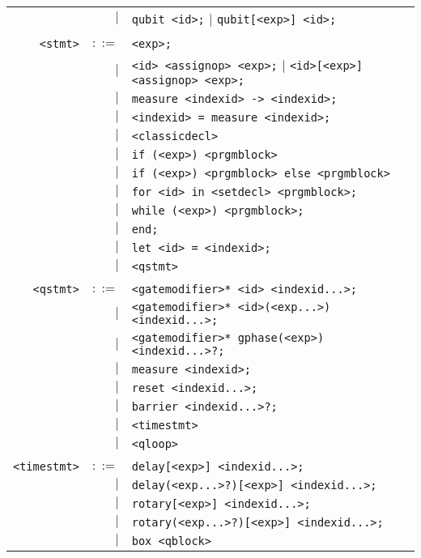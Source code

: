 \documentclass[notitlepage]{article}
\begin{document}
\begin{longtable}{rrl}
	    & $\mid$ & \texttt{qubit <id>;} $\mid$ \texttt{qubit[<exp>] <id>;} \\ \\
	\texttt{<stmt>} & $::=$ & \texttt{<exp>;} \\
	    & $\mid$ & \texttt{<id> <assignop> <exp>;} $\mid$ \texttt{<id>[<exp>] <assignop> <exp>;} \\
	    & $\mid$ & \texttt{measure <indexid> -> <indexid>;} \\
	    & $\mid$ & \texttt{<indexid> = measure <indexid>;} \\
	    & $\mid$ & \texttt{<classicdecl>} \\
	    & $\mid$ & \texttt{if (<exp>) <prgmblock>} \\
	    & $\mid$ & \texttt{if (<exp>) <prgmblock> else <prgmblock>} \\
	    & $\mid$ & \texttt{for <id> in <setdecl> <prgmblock>;} \\
	    & $\mid$ & \texttt{while (<exp>) <prgmblock>;} \\
	    & $\mid$ & \texttt{end;} \\
	    & $\mid$ & \texttt{let <id> = <indexid>;} \\
	    & $\mid$ & \texttt{<qstmt>} \\ \\
	\texttt{<qstmt>} & $::=$ & \texttt{<gatemodifier>* <id> <indexid...>;} \\
	    & $\mid$ & \texttt{<gatemodifier>* <id>(<exp...>) <indexid...>;} \\
	    & $\mid$ & \texttt{<gatemodifier>* gphase(<exp>) <indexid...>?;} \\
	    & $\mid$ & \texttt{measure <indexid>;} \\
	    & $\mid$ & \texttt{reset <indexid...>;} \\
	    & $\mid$ & \texttt{barrier <indexid...>?;} \\
	    & $\mid$ & \texttt{<timestmt>} \\
	    & $\mid$ & \texttt{<qloop>} \\ \\
	\texttt{<timestmt>} & $::=$ & \texttt{delay[<exp>] <indexid...>;} \\
	    & $\mid$ & \texttt{delay(<exp...>?)[<exp>] <indexid...>;} \\
	    & $\mid$ & \texttt{rotary[<exp>] <indexid...>;} \\
	    & $\mid$ & \texttt{rotary(<exp...>?)[<exp>] <indexid...>;} \\
	    & $\mid$ & \texttt{box <qblock>} \\

\end{longtable}
\end{document}
